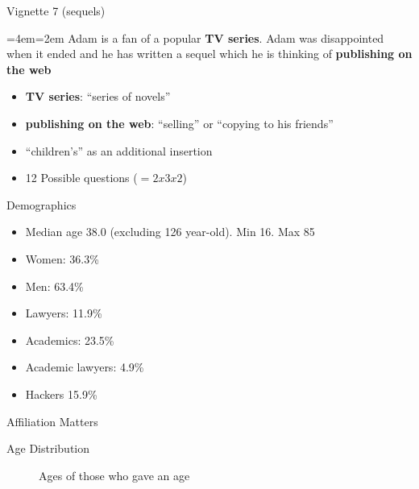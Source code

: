 \documentclass{beamer}
\newenvironment{blockquote}{%
  \par%
  \medskip
  \leftskip=4em\rightskip=2em%
  \noindent\ignorespaces}{%
  \par\medskip}
\begin{document}
\begin{frame}{Vignette 7 (sequels)}

\begin{blockquote}
      Adam is a fan of a popular {\bf TV series}. Adam was disappointed when it ended and he has written a sequel which he is thinking of {\bf publishing on the web}
\end{blockquote}
%
  \begin{itemize}
  \item {\bf TV series}: ``series of novels''
  \item {\bf publishing on the web}: ``selling'' or ``copying to his friends''
  \item ``children's'' as an additional insertion
  \item 12 Possible questions ($=2 x 3 x 2$)
\end{itemize}

  
\end{frame}

\begin{frame}{Demographics}
  \begin{itemize}
  \item Median age 38.0 (excluding 126 year-old). Min 16. Max 85
  \item Women: 36.3\%
  \item Men: 63.4\%
  \item Lawyers: 11.9\%
  \item Academics: 23.5\%
  \item Academic lawyers: 4.9\%
  \item Hackers 15.9\%
  \end{itemize}
\end{frame}

\begin{frame}{Affiliation Matters}
  \begin{figure}
    \scalebox{0.7}{}
  \end{figure}
  
\end{frame}

\begin{frame}{Age Distribution}
  \begin{figure}
    
    {Ages of those who gave an age}
\scalebox{0.7}{}    
  \end{figure}
\end{frame}
\end{document}
